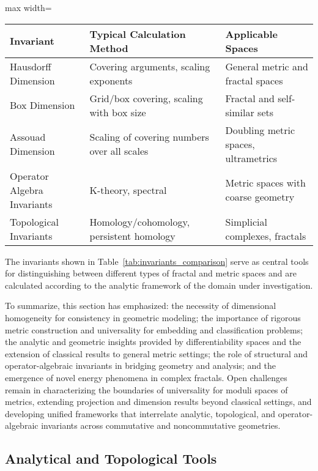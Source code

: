 \documentclass[sigconf]{acmart}
\begin{document}
\begin{table*}[htbp]
\centering
\caption{Key Invariants Across Metric Spaces and Their Calculation Methods}
\label{tab:invariants_comparison}
\begin{adjustbox}{max width=\textwidth}
\begin{tabular}{lll}
\toprule
\textbf{Invariant} & \textbf{Typical Calculation Method} & \textbf{Applicable Spaces} \\
\midrule
Hausdorff Dimension & Covering arguments, scaling exponents & General metric and fractal spaces \\
Box Dimension & Grid/box covering, scaling with box size & Fractal and self-similar sets \\
Assouad Dimension & Scaling of covering numbers over all scales & Doubling metric spaces, ultrametrics \\
Operator Algebra Invariants & K-theory, spectral & Metric spaces with coarse geometry \\
Topological Invariants & Homology/cohomology, persistent homology & Simplicial complexes, fractals \\
\bottomrule
\end{tabular}
\end{adjustbox}
\end{table*}

The invariants shown in Table~\ref{tab:invariants_comparison} serve as central tools for distinguishing between different types of fractal and metric spaces and are calculated according to the analytic framework of the domain under investigation.

To summarize, this section has emphasized: the necessity of dimensional homogeneity for consistency in geometric modeling; the importance of rigorous metric construction and universality for embedding and classification problems; the analytic and geometric insights provided by differentiability spaces and the extension of classical results to general metric settings; the role of structural and operator-algebraic invariants in bridging geometry and analysis; and the emergence of novel energy phenomena in complex fractals. Open challenges remain in characterizing the boundaries of universality for moduli spaces of metrics, extending projection and dimension results beyond classical settings, and developing unified frameworks that interrelate analytic, topological, and operator-algebraic invariants across commutative and noncommutative geometries.

\subsection{Analytical and Topological Tools}
\end{document}
